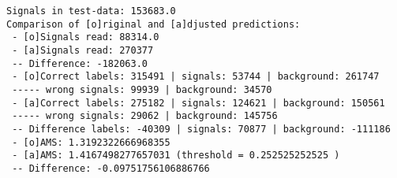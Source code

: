 \par\vspace{1\smallerfontscale}%
    \begin{addmargin}[\cellleftmargin]{0em}%
    {\smaller%
    \vspace{-1\smallerfontscale}%
    
    \begin{Verbatim}[commandchars=\\\{\}]
Signals in test-data: 153683.0
Comparison of [o]riginal and [a]djusted predictions:
 - [o]Signals read: 88314.0 
 - [a]Signals read: 270377 
 -- Difference: -182063.0 
 - [o]Correct labels: 315491 | signals: 53744 | background: 261747 
 ----- wrong signals: 99939 | background: 34570 
 - [a]Correct labels: 275182 | signals: 124621 | background: 150561 
 ----- wrong signals: 29062 | background: 145756 
 -- Difference labels: -40309 | signals: 70877 | background: -111186 
 - [o]AMS: 1.3192322666968355 
 - [a]AMS: 1.4167498277657031 (threshold = 0.252525252525 )
 -- Difference: -0.09751756106886766
    \end{Verbatim}
}%
    \end{addmargin}%

